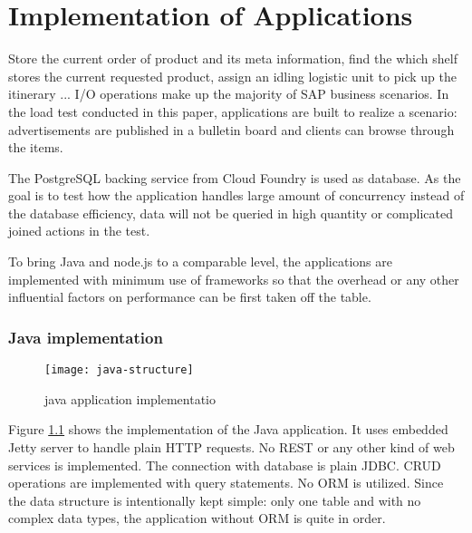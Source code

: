 \chapter{Implementation of Applications}
Store the current order of product and its meta information, find the which shelf stores the current requested product, assign an idling logistic unit to pick up the itinerary ... I/O operations make up the majority of SAP business scenarios.    
 In the load test conducted in this paper, applications are built to realize a scenario: advertisements are published in a bulletin board and clients can browse through the items. 

The PostgreSQL backing service from Cloud Foundry is used as database. As the goal is to test how the application handles large amount of concurrency instead of the database efficiency, data will not be queried in high quantity or complicated joined actions  in the test. 

To bring Java and node.js to a comparable level, the applications are implemented with minimum use of frameworks so that the overhead or any other influential factors on performance can be first taken off the table. 
\subsection{Java implementation}

\begin{figure}[h]
	\centering
	\texttt{[image: java-structure]}
	\caption{java application implementatio}
	\label{java-implementation}
\end{figure}

Figure \ref{java-implementation} shows the implementation of the Java application. It uses embedded Jetty server to handle plain HTTP requests. No REST or any other kind of web services is implemented. The connection with database is plain JDBC. CRUD operations are implemented with query statements. No ORM is utilized. Since the data structure is intentionally kept simple: only one table and with no complex data types, the application without ORM is quite in order.\\
